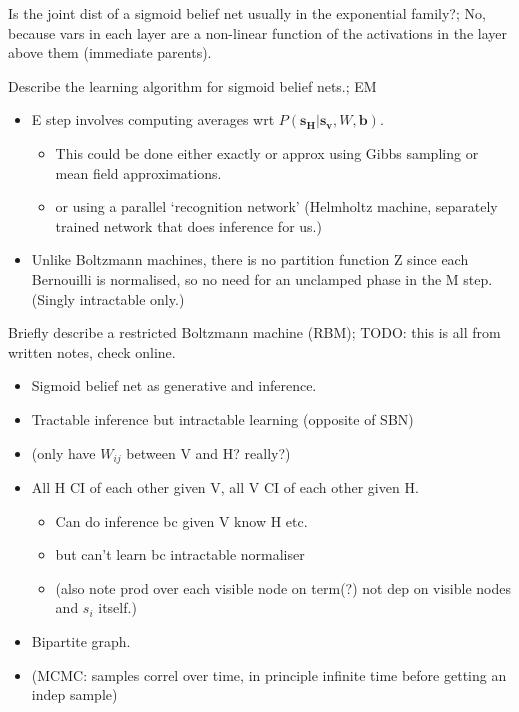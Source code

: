\documentclass{article}
\begin{document}
Is the joint dist of a sigmoid belief net usually in the exponential family?; No, because vars in each layer are a non-linear function of the activations in the layer above them (immediate parents).

Describe the learning algorithm for sigmoid belief nets.; EM \begin{itemize}
    \item E step involves computing averages wrt $P(\mathbf{s_H | s_v}, W, \mathbf{b})$. 
    \begin{itemize}
        \item This could be done either exactly or approx using Gibbs sampling or mean field approximations.
        \item or using a parallel `recognition network' (Helmholtz machine, separately trained network that does inference for us.)
    \end{itemize}
    \item Unlike Boltzmann machines, there is no partition function Z since each Bernouilli is normalised, so no need for an unclamped phase in the M step. (Singly intractable only.)
\end{itemize}

Briefly describe a restricted Boltzmann machine (RBM); TODO: this is all from written notes, check online. \begin{itemize}
    \item Sigmoid belief net as generative and inference.
    \item Tractable inference but intractable learning (opposite of SBN)
    \item (only have $W_{ij}$ between V and H? really?)
    \item All H CI of each other given V, all V CI of each other given H.
    \begin{itemize}
        \item Can do inference bc given V know H etc.
        \item but can't learn bc intractable normaliser
        \item (also note prod over each visible node on term(?) not dep on visible nodes and $s_i$ itself.)
    \end{itemize}
    \item Bipartite graph.
    \item (MCMC: samples correl over time, in principle infinite time before getting an indep sample)
\end{itemize}
\end{document}
